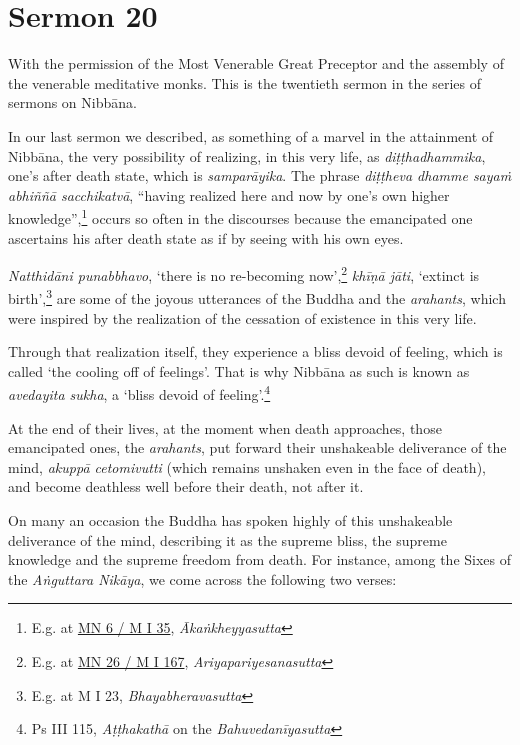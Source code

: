 \chapter{Sermon 20}

\NibbanaOpeningQuote

With the permission of the Most Venerable Great Preceptor and the assembly of the venerable meditative monks. This is the twentieth sermon in the series of sermons on Nibbāna.

In our last sermon we described, as something of a marvel in the attainment of Nibbāna, the very possibility of realizing, in this very life, as \emph{diṭṭhadhammika}, one's after death state, which is \emph{samparāyika}. The phrase \emph{diṭṭheva dhamme sayaṁ abhiññā sacchikatvā}, ``having realized here and now by one's own higher knowledge'',\footnote{E.g. at \href{https://suttacentral.net/mn6/pli/ms}{MN 6 / M I 35}, \emph{Ākaṅkheyyasutta}} occurs so often in the discourses because the emancipated one ascertains his after death state as if by seeing with his own eyes.

\enlargethispage{\baselineskip}

\emph{Natthidāni punabbhavo}, `there is no re-becoming now',\footnote{E.g. at \href{https://suttacentral.net/mn26/pli/ms}{MN 26 / M I 167}, \emph{Ariyapariyesanasutta}} \emph{khīṇā jāti}, `extinct is birth',\footnote{E.g. at M I 23, \emph{Bhayabheravasutta}} are some of the joyous utterances of the Buddha and the \emph{arahants}, which were inspired by the realization of the cessation of existence in this very life.

Through that realization itself, they experience a bliss devoid of feeling, which is called `the cooling off of feelings'. That is why Nibbāna as such is known as \emph{avedayita sukha}, a `bliss devoid of feeling'.\footnote{Ps III 115, \emph{Aṭṭhakathā} on the \emph{Bahuvedanīyasutta}}

At the end of their lives, at the moment when death approaches, those emancipated ones, the \emph{arahants}, put forward their unshakeable deliverance of the mind, \emph{akuppā cetomivutti} (which remains unshaken even in the face of death), and become deathless well before their death, not after it.

On many an occasion the Buddha has spoken highly of this unshakeable deliverance of the mind, describing it as the supreme bliss, the supreme knowledge and the supreme freedom from death. For instance, among the Sixes of the \emph{Aṅguttara Nikāya}, we come across the following two verses:


